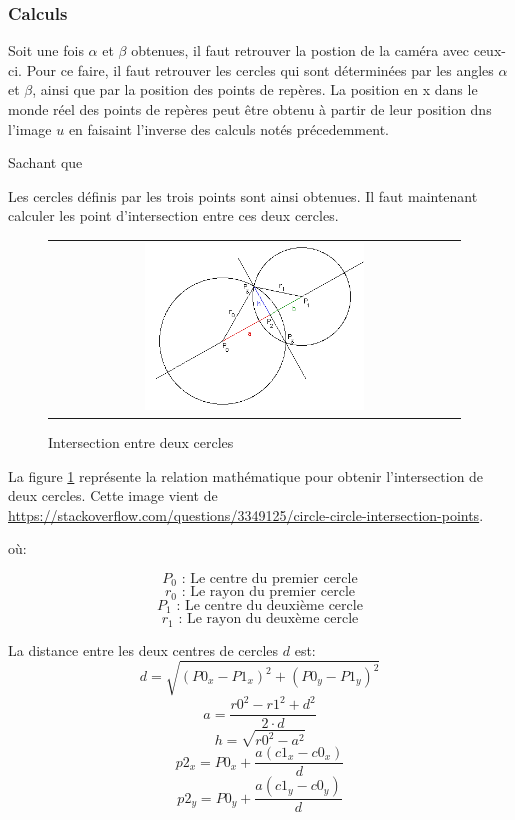 \documentclass[12pt]{article}
\begin{document}
\subsubsection{Calculs}
Soit une fois $\alpha$ et $\beta$ obtenues, il faut retrouver la postion de la cam\'era avec ceux-ci.
Pour ce faire, il faut retrouver les cercles qui sont d\'etermin\'ees par les angles $\alpha$ et $\beta$, ainsi que par la position des points de repères.
La position en x dans le monde r\'eel des points de rep\`eres peut \^etre obtenu \`a partir de leur position dns l'image $u$ en faisaint l'inverse des calculs notés précedemment.

Sachant que

Les cercles définis par les trois points sont ainsi obtenues.
Il faut maintenant calculer les point d'intersection entre ces deux cercles.

\begin{figure}[ht]
 \begin{center}
  \begin{tabular}{c}
    \includegraphics[width=0.55\textwidth]{circle_intersection.png}
  \end{tabular}
 \end{center}
\vspace{-0.25in}
 \caption{Intersection entre deux cercles}
    \label{circle_intersection}
\end{figure}

La figure \ref{circle_intersection} repr\'esente la relation math\'ematique pour obtenir l'intersection de deux cercles.
Cette image vient de \url{https://stackoverflow.com/questions/3349125/circle-circle-intersection-points}.

o\`u:

   \[ P_0 \text{ : Le centre du premier cercle} \]
   \[ r_0 \text{ : Le rayon du premier cercle} \]
   \[ P_1 \text{ : Le centre du deuxi\`eme cercle} \]
   \[ r_1 \text{ : Le rayon du deux\`eme cercle} \]


La distance entre les deux centres de cercles $d$ est:
\[ d = \sqrt{(P0_x - P1_x)^2 + (P0_y - P1_y)^2} \]
\[ a = \frac{r0^2 - r1^2 + d^2}{2 \cdot d} \]
\[ h = \sqrt{r0^2 - a^2} \]
\[ p2_x = P0_x + \frac{a(c1_x - c0_x)}{d} \]
\[ p2_y = P0_y + \frac{a(c1_y - c0_y)}{d} \]
\end{document}
